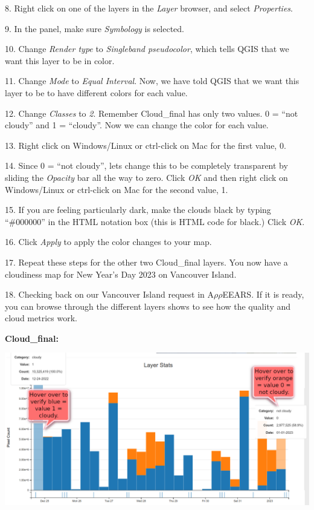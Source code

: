 \documentclass[oneside,a4paper,11pt,explicit]{book}
\begin{document}
	8. Right click on one of the layers in the \textit{Layer} browser, and select \textit{Properties}.
	
	9. In the panel, make sure \textit{Symbology} is selected.
	
	10. Change \textit{Render type} to \textit{Singleband pseudocolor}, which tells QGIS that we want this layer to be in color.
	
	11. Change \textit{Mode} to \textit{Equal Interval}. Now, we have told QGIS that we want this layer to be to have different colors for each value. 
	
	12. Change \textit{Classes} to \textit{2}. Remember Cloud\_final has only two values. 0 = ``not cloudy'' and 1 = ``cloudy''. Now we can change the color for each value.
	
	13. Right click on Windows/Linux or ctrl-click on Mac for the first value, 0. 
	
	14. Since 0 = ``not cloudy'', lets change this to be completely transparent by sliding the \textit{Opacity} bar all the way to zero. Click \textit{OK} and then right click on Windows/Linux or ctrl-click on Mac for the second value, 1. 
	
	15. If you are feeling particularly dark, make the clouds black by typing ``\#000000'' in the HTML notation box (this is HTML code for black.) Click \textit{OK}.
	
	16. Click \textit{Apply} to apply the color changes to your map.
	
	17. Repeat these steps for the other two Cloud\_final layers. You now have a cloudiness map for New Year's Day 2023 on Vancouver Island.
	
	18. Checking back on our Vancouver Island request in A$\rho\rho$EEARS. If it is ready, you can browse through the different layers shows to see how the quality and cloud metrics work. 
	
	\textbf{Cloud\_final:}
	
	\centerline{\includegraphics[width=.85\textwidth]{Cloud_final_Layer.png}}
	
\end{document}
